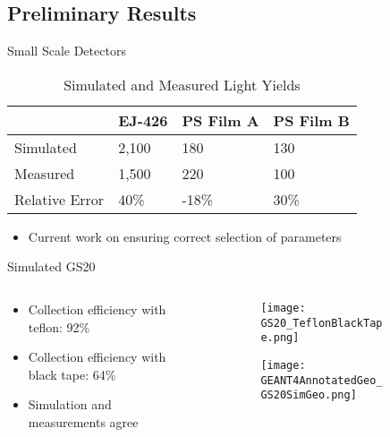 \subsection{Preliminary Results}
\begin{frame}{Small Scale Detectors}
\begin{table}
  \centering
  \caption[Simulated and Measured Light Yields]{Simulated and Measured Light Yields}
  \begin{tabular}{m{2cm}| m{2cm} m{2cm} m{2cm}}
  \toprule
  & EJ-426 & PS Film A & PS Film B \\
  \midrule
  Simulated & 2,100 & 180 & 130 \\
  Measured & 1,500 & 220 & 100 \\
  Relative Error & 40\% & -18\% & 30\% \\
  \bottomrule
  \end{tabular}
\end{table}
\begin{itemize}
  \item Current work on ensuring correct selection of parameters
\end{itemize}
\end{frame}
\begin{frame}{Simulated GS20}
  \begin{columns}[onlytextwidth]
    \begin{column}{0.55\textwidth}
      \begin{itemize}
        \item Collection efficiency with teflon: 92\%
        \item Collection efficiency with black tape: 64\%
        \item Simulation and measurements agree
      \end{itemize}
    \end{column}
    \begin{column}{0.4\textwidth}
      \begin{figure}
        \vspace*{-1cm}
        \begin{subfigure}[b]{\textwidth}
        \texttt{[image: GS20\_TeflonBlackTape.png]}
        \end{subfigure}
        
        \begin{subfigure}[b]{\textwidth}
        \texttt{[image: GEANT4AnnotatedGeo\_GS20SimGeo.png]}
        \end{subfigure}
      \end{figure}
    \end{column}
  \end{columns}
\end{frame}
